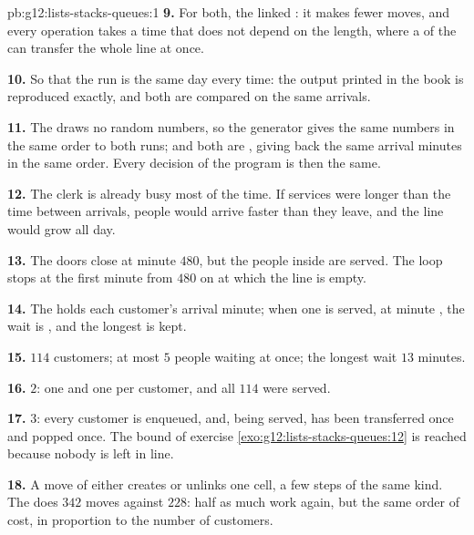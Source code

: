\begin{solution}{pb:g12:lists-stacks-queues:1}
\textbf{9.} For both, the linked : it makes fewer moves, and every operation takes a time that does not depend
on the length, where a  of the   can transfer the whole line at once.

\textbf{10.} So that the run is the same day every time: the output printed in the book is reproduced exactly, and
both  are compared on the same arrivals.

\textbf{11.} The  draws no random numbers, so the generator gives the same numbers in the same order to both
runs; and both are , giving back the same arrival minutes in the same order. Every decision of the program is
then the same.

\textbf{12.} The clerk is already busy most of the time. If services were longer than the time between arrivals,
people would arrive faster than they leave, and the line would grow all day.

\textbf{13.} The doors close at minute $480$, but the people inside are served. The loop stops at the first minute
from $480$ on at which the line is empty.

\textbf{14.} The  holds each customer's arrival minute; when one is served, at minute , the wait is
, and the longest is kept.

\textbf{15.} $114$ customers; at most $5$ people waiting at once; the longest wait $13$ minutes.

\textbf{16.} $2$: one  and one  per customer, and all $114$ were served.

\textbf{17.} $3$: every customer is enqueued, and, being served, has been transferred once and popped once. The bound
of exercise \ref{exo:g12:lists-stacks-queues:12} is reached because nobody is left in line.

\textbf{18.} A move of either  creates or unlinks one cell, a few steps of the same kind. The   does
$342$ moves against $228$: half as much work again, but the same order of cost, in proportion to the number of
customers.


\end{solution}
